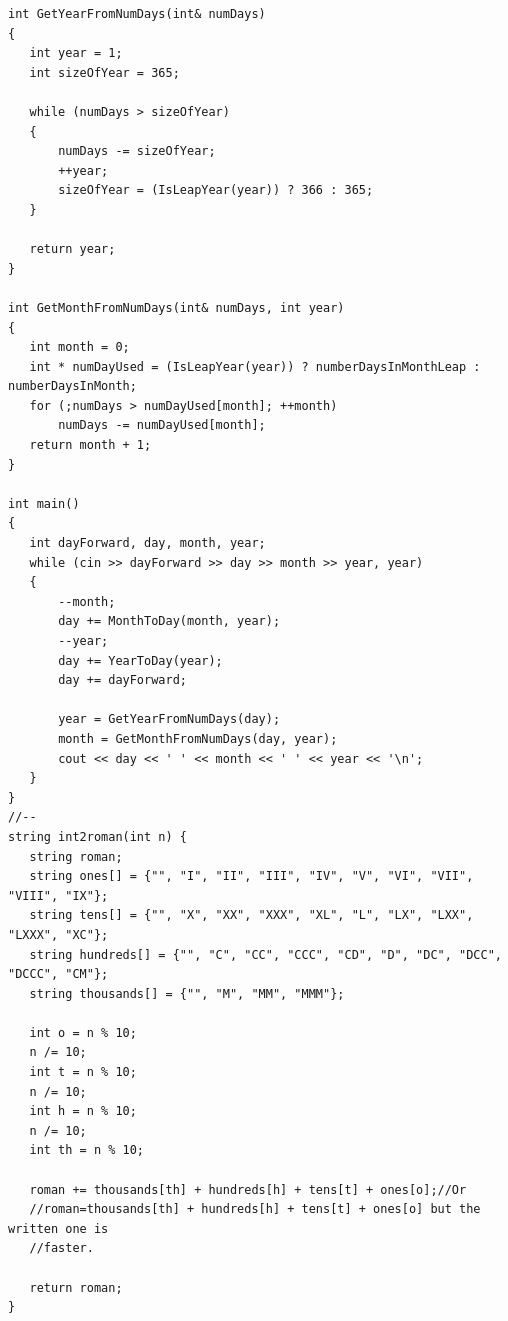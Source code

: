 \documentclass[8pt, a4paper, oneside, twocolumn]{extarticle}
\begin{document}
\begin{itemize}
\begin{verbatim}
int GetYearFromNumDays(int& numDays)
{
   int year = 1;
   int sizeOfYear = 365;

   while (numDays > sizeOfYear)
   {
       numDays -= sizeOfYear;
       ++year;
       sizeOfYear = (IsLeapYear(year)) ? 366 : 365;
   }

   return year;
}

int GetMonthFromNumDays(int& numDays, int year)
{
   int month = 0;
   int * numDayUsed = (IsLeapYear(year)) ? numberDaysInMonthLeap : numberDaysInMonth;
   for (;numDays > numDayUsed[month]; ++month)
       numDays -= numDayUsed[month];
   return month + 1;
}

int main()
{
   int dayForward, day, month, year;
   while (cin >> dayForward >> day >> month >> year, year)
   {
       --month;
       day += MonthToDay(month, year);
       --year;
       day += YearToDay(year);
       day += dayForward;

       year = GetYearFromNumDays(day);
       month = GetMonthFromNumDays(day, year);
       cout << day << ' ' << month << ' ' << year << '\n';
   }
}
//--
string int2roman(int n) {
   string roman;
   string ones[] = {"", "I", "II", "III", "IV", "V", "VI", "VII", "VIII", "IX"};
   string tens[] = {"", "X", "XX", "XXX", "XL", "L", "LX", "LXX", "LXXX", "XC"};
   string hundreds[] = {"", "C", "CC", "CCC", "CD", "D", "DC", "DCC", "DCCC", "CM"};
   string thousands[] = {"", "M", "MM", "MMM"};

   int o = n % 10;
   n /= 10;
   int t = n % 10;
   n /= 10;
   int h = n % 10;
   n /= 10;
   int th = n % 10;

   roman += thousands[th] + hundreds[h] + tens[t] + ones[o];//Or
   //roman=thousands[th] + hundreds[h] + tens[t] + ones[o] but the written one is
   //faster.

   return roman;
}


\end{verbatim}
\end{itemize}
\end{document}
